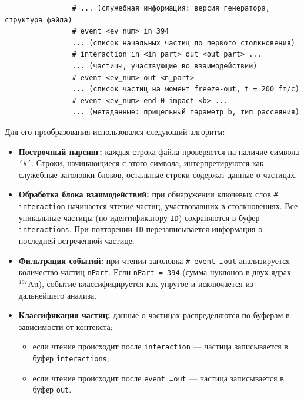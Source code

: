 \documentclass{extarticle}
\begin{document}
            \begin{verbatim}
                # ... (служебная информация: версия генератора, структура файла)
                # event <ev_num> in 394
                ... (список начальных частиц до первого столкновения)
                # interaction in <in_part> out <out_part> ...
                ... (частицы, участвующие во взаимодействии)
                # event <ev_num> out <n_part>
                ... (список частиц на момент freeze-out, t = 200 fm/c)
                # event <ev_num> end 0 impact <b> ...
                ... (метаданные: прицельный параметр b, тип рассеяния)
            \end{verbatim}

            Для его преобразования использовался следующий алгоритм:

            \begin{itemize}
                \item \textbf{Построчный парсинг:} 
                    каждая строка файла проверяется на наличие символа \texttt{'\#'}. 
                    Строки, начинающиеся с этого символа, 
                    интерпретируются как служебные заголовки блоков, 
                    остальные строки содержат данные о частицах.

                \item \textbf{Обработка блока взаимодействий:} 
                    при обнаружении ключевых слов \texttt{\# interaction} 
                    начинается чтение частиц, участвовавших в столкновениях. 
                    Все уникальные частицы (по идентификатору \texttt{ID}) 
                    сохраняются в буфер \texttt{interactions}. 
                    При повторении \texttt{ID} перезаписывается информация 
                    о последней встреченной частице.

                \item \textbf{Фильтрация событий:}
                    при чтении заголовка \texttt{\# event \ldots out} 
                    анализируется количество частиц \texttt{nPart}. 
                    Если \texttt{nPart = 394} (сумма нуклонов в двух ядрах $^{197}\text{Au}$), 
                    событие классифицируется как упругое и исключается из дальнейшего анализа.

                \item \textbf{Классификация частиц:} 
                    данные о частицах распределяются по буферам в зависимости от контекста:
                    \begin{itemize}
                        \item 
                            если чтение происходит после \texttt{interaction} 
                            --- частица записывается в буфер \texttt{interactions};
                        \item 
                            если чтение происходит после \texttt{event \ldots out} 
                            --- частица записывается в буфер \texttt{out}.
                    \end{itemize}


\end{itemize}
\end{document}
